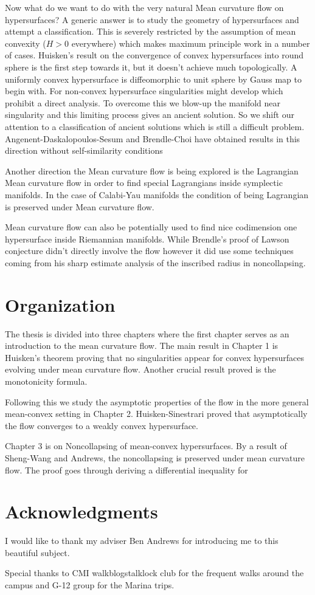 Now what do we want to do with the very natural Mean curvature flow on hypersurfaces? A generic answer is to study the geometry of hypersurfaces and attempt a classification. This is severely restricted by the assumption of mean convexity ($ H>0 $ everywhere) which makes maximum principle work in a number of cases. Huisken's result on the convergence of convex hypersurfaces into round sphere is the first step towards it, but it doesn't achieve much topologically. A uniformly convex hypersurface is diffeomorphic to unit sphere by Gauss map to begin with. For non-convex hypersurface singularities might develop which prohibit a direct analysis. To overcome this we blow-up the manifold near singularity and this limiting process gives an ancient solution. So we shift our attention to a classification of ancient solutions which is still a difficult problem. Angenent-Daskalopoulos-Sesum and Brendle-Choi have obtained results in this direction without self-similarity conditions

Another direction the Mean curvature flow is being explored is the Lagrangian Mean curvature flow in order to find special Lagrangians inside symplectic manifolds. In the case of Calabi-Yau manifolds the condition of being Lagrangian is preserved under Mean curvature flow.

Mean curvature flow can also be potentially used to find nice codimension one hypersurface inside Riemannian manifolds. While Brendle's proof of Lawson conjecture didn't directly involve the flow however it did use some techniques coming from his sharp estimate analysis of the inscribed radius in noncollapsing. 

\section*{Organization}

The thesis is divided into three chapters where the first chapter serves as an introduction to the mean curvature flow. The main result in Chapter 1 is Huisken's theorem proving that no singularities appear for convex hypersurfaces evolving under mean curvature flow. Another crucial result proved is the monotonicity formula. 

Following this we study the asymptotic properties of the flow in the more general mean-convex setting in Chapter 2. Huisken-Sinestrari proved that asymptotically the flow converges to a weakly convex hypersurface.  

Chapter 3 is on Noncollapsing of mean-convex hypersurfaces. By a result of Sheng-Wang and Andrews, the noncollapsing is preserved under mean curvature flow. The proof goes through deriving a differential inequality for 

\section*{Acknowledgments}

I would like to thank my adviser Ben Andrews for introducing me to this beautiful subject. 

Special thanks to CMI walkblogstalklock club for the frequent walks around the campus and G-12 group for the Marina trips. 